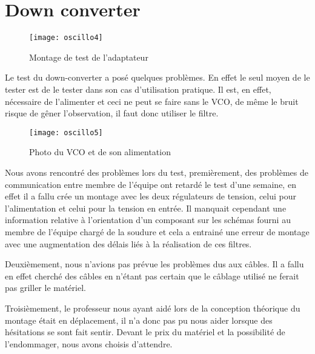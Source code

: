 \section{Down converter}
\label{sec:down_converter}



\begin{figure}[h]
  \centering
  \texttt{[image: oscillo4]}
  \caption{Montage de test de l’adaptateur}
  \label{fig:mont}
\end{figure}


Le test du down-converter a posé quelques problèmes. En effet le seul moyen de le tester est de le tester dans son cas d’utilisation pratique. Il est, en effet, nécessaire de l’alimenter et  ceci ne peut se faire sans le VCO, de même le bruit risque de gêner l’observation, il faut donc utiliser le filtre.


\begin{figure}[h]
  \centering
  \texttt{[image: oscillo5]}
  \caption{Photo du VCO et de son alimentation}
  \label{fig:photo}
\end{figure}



Nous avons rencontré des problèmes lors du test, premièrement, des problèmes de communication entre membre de l’équipe ont retardé le test d’une semaine, en effet il a fallu crée un montage avec les deux régulateurs de tension, celui pour l’alimentation et celui pour la tension en entrée. Il manquait cependant une information relative à l'orientation d'un composant sur les schémas fourni au membre de l'équipe chargé de la soudure et cela a entrainé une erreur de montage avec une augmentation des délais liés à la réalisation de ces filtres.

Deuxièmement, nous n’avions pas prévue les problèmes dus aux câbles. Il a fallu en effet cherché des câbles en n’étant pas certain que le câblage utilisé ne ferait pas griller le matériel.

Troisièmement, le professeur nous ayant aidé lors de la conception théorique du montage était en déplacement, il n’a donc pas pu nous aider lorsque des hésitations se sont fait sentir. Devant le prix du matériel et la possibilité de l'endommager, nous avons choisis d'attendre.





